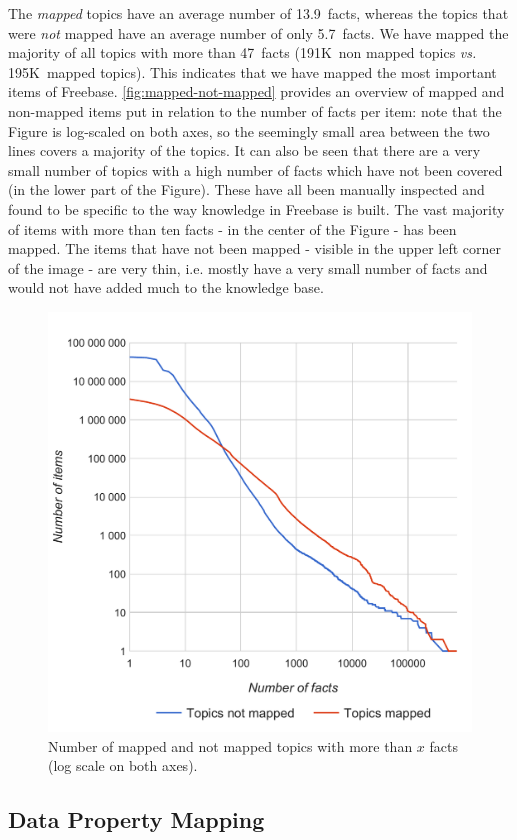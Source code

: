 \documentclass{acm_proc_article-sp}
\begin{document}
The \emph{mapped} topics have an average number of 13.9~facts,
whereas the topics that were \emph{not} mapped have an average number of only 5.7~facts.
We have mapped the majority of all topics with more than 47~facts
(191K~non mapped topics \textit{vs.} 195K~mapped topics).
This indicates that we have mapped the most important items of Freebase.
\autoref{fig:mapped-not-mapped} provides an overview of mapped and non-mapped items
put in relation to the number of facts per item: note that the Figure is log-scaled
on both axes, so the seemingly small area between the two lines covers a majority of
the topics. It can also be seen that there are a very small number of topics with
a high number of facts which have not been covered (in the lower part of the Figure).
These have all been manually inspected and found to be specific to the way knowledge
in Freebase is built. The vast majority of items with more than ten facts - in the
center of the Figure - has been mapped. The items that have not been mapped -
visible in the upper left corner of the image - are very thin,
i.e. mostly have a very small number of facts and
would not have added much to the knowledge base.

\begin{figure}[!htbp]
  \centering
  \includegraphics[width=8.45 cm]{img/facts-topics-mapping.pdf}
  \caption{Number of mapped and not mapped topics with more than $x$ facts (log scale on both axes).}
  \label{fig:mapped-not-mapped}
\end{figure}

\subsection{Data Property Mapping}
\end{document}
